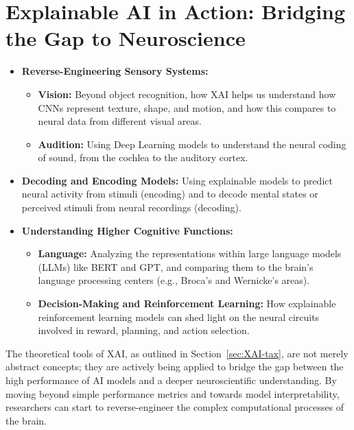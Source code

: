 \section{Explainable AI in Action: Bridging the Gap to Neuroscience}
\begin{itemize}
    \item \textbf{Reverse-Engineering Sensory Systems:}
        \begin{itemize}
            \item \textbf{Vision:} Beyond object recognition, how XAI helps us understand how CNNs represent texture, shape, and motion, and how this compares to neural data from different visual areas.
            \item \textbf{Audition:} Using Deep Learning models to understand the neural coding of sound, from the cochlea to the auditory cortex.
        \end{itemize}
    \item \textbf{Decoding and Encoding Models:} Using explainable models to predict neural activity from stimuli (encoding) and to decode mental states or perceived stimuli from neural recordings (decoding).
    \item \textbf{Understanding Higher Cognitive Functions:}
        \begin{itemize}
            \item \textbf{Language:} Analyzing the representations within large language models (LLMs) like BERT and GPT, and comparing them to the brain's language processing centers (e.g., Broca's and Wernicke's areas).
            \item \textbf{Decision-Making and Reinforcement Learning:} How explainable reinforcement learning models can shed light on the neural circuits involved in reward, planning, and action selection.
        \end{itemize}
\end{itemize}

The theoretical tools of XAI, as outlined in Section~\ref{sec:XAI-tax}, are not merely abstract concepts; they are actively being applied to bridge the gap between the high performance of AI models and a deeper neuroscientific understanding. By moving beyond simple performance metrics and towards model interpretability, researchers can start to reverse-engineer the complex computational processes of the brain.

